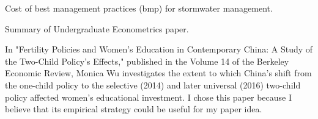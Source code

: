 \documentclass[11pt,answers]{exam}
\begin{document}
\begin{questions}
\begin{parts}
\end{parts}

\newpage
\question Cost of best management practices (bmp) for stormwater management.


\question Summary of Undergraduate Econometrics paper.

In "Fertility Policies and Women’s Education in Contemporary China: A Study of the Two-Child Policy's Effects," published in the Volume 14 of the Berkeley Economic Review, Monica Wu investigates the extent to which China's shift from the one-child policy to the selective (2014) and later universal (2016) two-child policy affected women's educational investment. I chose this paper because I believe that its empirical strategy could be useful for my paper idea.


\end{questions}
\end{document}
